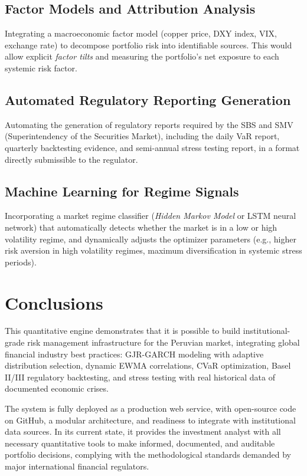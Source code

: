 \documentclass[11pt,a4paper]{article}
\begin{document}
\subsection{Factor Models and Attribution Analysis}

Integrating a macroeconomic factor model (copper price, DXY index, VIX, exchange rate)
to decompose portfolio risk into identifiable sources. This would allow explicit
\textit{factor tilts} and measuring the portfolio's net exposure to each systemic risk factor.

\subsection{Automated Regulatory Reporting Generation}

Automating the generation of regulatory reports required by the SBS and
SMV (Superintendency of the Securities Market), including the daily VaR report,
quarterly backtesting evidence, and semi-annual stress testing report,
in a format directly submissible to the regulator.

\subsection{Machine Learning for Regime Signals}

Incorporating a market regime classifier (\textit{Hidden Markov Model} or LSTM neural network)
that automatically detects whether the market is in a low or high volatility regime,
and dynamically adjusts the optimizer parameters (e.g., higher risk aversion in high volatility
regimes, maximum diversification in systemic stress periods).

\section{Conclusions}

This quantitative engine demonstrates that it is possible to build institutional-grade
risk management infrastructure for the Peruvian market, integrating global financial
industry best practices: GJR-GARCH modeling with adaptive distribution selection,
dynamic EWMA correlations, CVaR optimization, Basel II/III regulatory backtesting,
and stress testing with real historical data of documented economic crises.

The system is fully deployed as a production web service, with open-source code
on GitHub, a modular architecture, and readiness to integrate with institutional data sources.
In its current state, it provides the investment analyst with all necessary quantitative tools
to make informed, documented, and auditable portfolio decisions, complying with the
methodological standards demanded by major international financial regulators.
\end{document}
